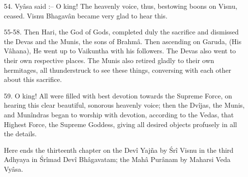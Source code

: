 54. Vy\^asa said :-- O king! The heavenly voice, thus, bestowing boons on Visnu, ceased. Visnu Bhagav\^an became very glad to hear this.

55-58. Then Hari, the God of Gods, completed duly the sacrifice and dismissed the Devas and the Munis, the sons of Brahm\^a. Then ascending on Garuda, (His V\^ahana), He went up to Vaikuntha with his followers. The Devas also went to their own respective places. The Munis also retired gladly to their own hermitages, all thunderstruck to see these things, conversing with each other about this sacrifice.

59. O king! All were filled with best devotion towards the Supreme Force, on hearing this clear beautiful, sonorous heavenly voice; then the Dv\^ijas, the Munis, and Mun\^indras began to worship with devotion, according to the Vedas, that Highest Force, the Supreme Goddess, giving all desired objects profusely in all the details.

Here ends the thirteenth chapter on the Dev\^i Yaj\~na by \'Sr\^i Visnu in the third Adhyaya in \'Sr\^imad Dev\^i Bh\^agavatam; the Mah\^a Pur\^anam by Maharsi Veda Vy\^asa.